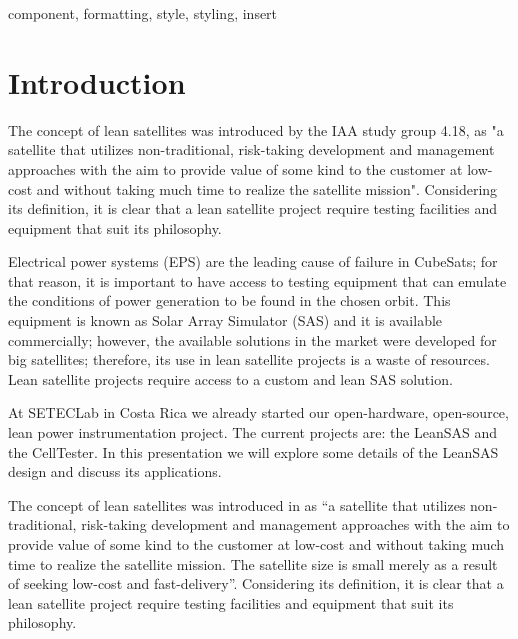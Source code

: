 \documentclass[conference]{IEEEtran}
\begin{document}
\begin{abstract}
This document is a model and instructions for \LaTeX.
This and the IEEEtran.cls file define the components of your paper [title, text, heads, etc.]. *CRITICAL: Do Not Use Symbols, Special Characters, Footnotes, 
or Math in Paper Title or Abstract.
\end{abstract}

\begin{IEEEkeywords}
component, formatting, style, styling, insert
\end{IEEEkeywords}

\section{Introduction}
{\color{red}The concept of lean satellites was introduced by the IAA study group 4.18, as "a satellite that utilizes non-traditional, risk-taking development and management approaches with the aim to provide value of some kind to the customer at low-cost and without taking much time to realize the satellite mission". Considering its definition, it is clear that a lean satellite project require testing facilities and equipment that suit its philosophy.

Electrical power systems (EPS) are the leading cause of failure in CubeSats; for that reason, it is important to have access to testing equipment that can emulate the conditions of power generation to be found in the chosen orbit. This equipment is known as Solar Array Simulator (SAS) and it is available commercially; however, the available solutions in the market were developed for big satellites; therefore, its use in lean satellite projects is a waste of resources. Lean satellite projects require access to a custom and lean SAS solution.

At SETECLab in Costa Rica we already started our open-hardware, open-source, lean power instrumentation project. The current projects are: the LeanSAS and the CellTester. In this presentation we will explore some details of the LeanSAS design and discuss its applications.}

The concept of lean satellites was introduced in \cite{leansat} as ``a satellite that utilizes non-traditional, risk-taking development and management approaches with the aim to provide value of some kind to the customer at low-cost and without taking much time to realize the satellite mission. The satellite size is small merely as a result of seeking low-cost and fast-delivery''. Considering its definition, it is clear that a lean satellite project require testing facilities and equipment that suit its philosophy. 
\end{document}
